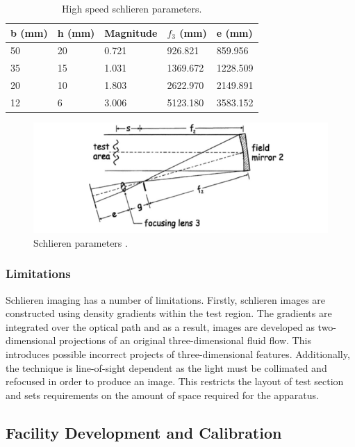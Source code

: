 \begin{table}[h]
\centering
\caption{High speed schlieren parameters.}
\label{tab:highspeed}
\begin{tabular}{@{}lllll@{}}
\toprule
b (mm) & h (mm) & Magnitude & $f_3$ (mm) & e (mm)   \\ \midrule
50     & 20     & 0.721     & 926.821    & 859.956  \\
35     & 15     & 1.031     & 1369.672   & 1228.509 \\
20     & 10     & 1.803     & 2622.970   & 2149.891 \\
12     & 6      & 3.006     & 5123.180   & 3583.152 \\ \bottomrule
\end{tabular}
\end{table}

\begin{figure}[H] 
	\centering
	\includegraphics[scale=0.8]{settle.png} 
	\caption{Schlieren parameters \cite{settles2001schlieren}.}
	\label{fig:settle}
\end{figure}

\subsubsection{Limitations}
Schlieren imaging has a number of limitations. Firstly, schlieren images are constructed using density gradients within the test region. The gradients are integrated over the optical path and as a result, images are developed as two-dimensional projections of an original three-dimensional fluid flow. This introduces possible incorrect projects of three-dimensional features. Additionally, the technique is line-of-sight dependent as the light must be collimated and refocused in order to produce an image. This restricts the layout of test section and sets requirements on the amount of space required for the apparatus. 

\subsection{Facility Development and Calibration}
